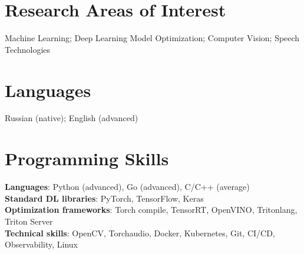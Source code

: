 \section{\sc Research Areas of Interest}
{Machine Learning; Deep Learning Model Optimization; Computer Vision; Speech Technologies}

\vspace{3pt}

\section{\sc Languages}
{Russian (native); English (advanced)}

\section{\sc Programming Skills}
\textbf{Languages}: Python (advanced), Go (advanced), C/C++ (average) \\
\textbf{Standard DL libraries}: PyTorch, TensorFlow, Keras \\
\textbf{Optimization frameworks}: Torch compile, TensorRT, OpenVINO, Tritonlang, Triton Server \\
\textbf{Technical skills}: OpenCV, Torchaudio, Docker, Kubernetes, Git, CI/CD, Observability, Linux

\endinput
